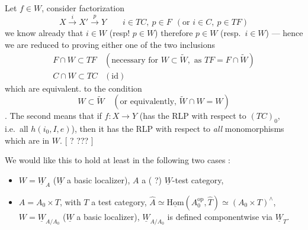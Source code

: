 \documentclass[11pt,a4paper]{article}
\begin{document}
Let $f \in W$, consider factorization
\[
  X \overset{i}{\longrightarrow} X'
  \overset{p}{\longrightarrow} Y
  \qquad i \in TC,\ p \in F \ \ (\text{or } i \in C,\ p \in TF)
\]
we know already that $i \in W$ (resp! $p \in W$) therefore $p \in W$
(resp.\ $i \in W$) — hence we are reduced to  proving
either one of the two inclusions
\[
  \begin{array}{ll}
    F \cap W \subset TF & (\text{necessary for } W \subset \widetilde{W}, \text{ as } TF = F \cap \widetilde{W}) \\
    C \cap W \subset TC & (\text{id})
  \end{array}
\]
which are \struck{\ill{}} equivalent. \struck{\ill{}} \ill{} to the
condition \add{[first ?]}
\[
  W \subset \widetilde{W} \quad (\text{or equivalently, }
  \widetilde{W} \cap W = W)
\]
\add{[\ill{}]}.
The second means that if $f : X \to Y$ (has the  RLP with
respect to \struck{\ill{}} $(TC)_0$, i.e.\ all $h(i_0, I, e)$), then it has
the RLP with respect to \emph{all} monomorphisms which are in $W$.
[ ? ??? ]

We would like this to hold at least in the following two cases :
\begin{itemize}
  \item[a)] $W = \underline{W}_A$ ($\underline{W}$ a basic localizer),
  $A$ a ( ?) $\underline{W}$-test category,
  \item[b)] $A = A_0 \times T$, with $T$ a test category,
  $\widehat{A} \simeq \underline{\mathrm{Hom}}(A_0^{\mathrm{op}}, \widehat{T})
  \simeq (A_0 \times T)^{\wedge}$, $W = \underline{W}_{A/A_0}$
  ($\underline{W}$ a basic localizer), $\underline{W}_{A/A_0}$ is defined
  componentwise via $\underline{W}_T$.
\end{itemize}

\end{document}
